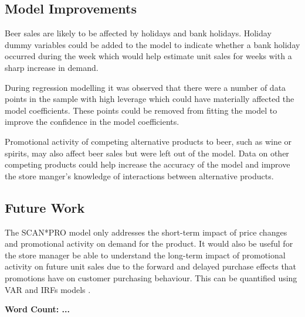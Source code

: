 \documentclass[a4paper,11pt]{article}
\begin{document}
\subsection{Model Improvements}
Beer sales are likely to be affected by holidays and bank holidays. Holiday dummy variables could be added to the model to indicate whether a bank holiday occurred during the week which would help estimate unit sales for weeks with a sharp increase in demand.

During regression modelling it was observed that there were a number of data points in the sample with high leverage which could have materially affected the model coefficients. These points could be removed from fitting the model to improve the confidence in the model coefficients. 

Promotional activity of competing alternative products to beer, such as wine or spirits, may also affect beer sales but were left out of the model. Data on other competing products could help increase the accuracy of the model and improve the store manger's knowledge of interactions between alternative products.

\subsection{Future Work}
The SCAN*PRO model only addresses the short-term impact of price changes and promotional activity on demand for the product. It would also be useful for the store manager be able to understand the long-term impact of promotional activity on future unit sales due to the forward and delayed purchase effects that promotions have on customer purchasing behaviour. This can be quantified using VAR and IRFs models \citep{srinivasan_promotions_2004}.  


\textbf{Word Count: ...}



\end{document}
